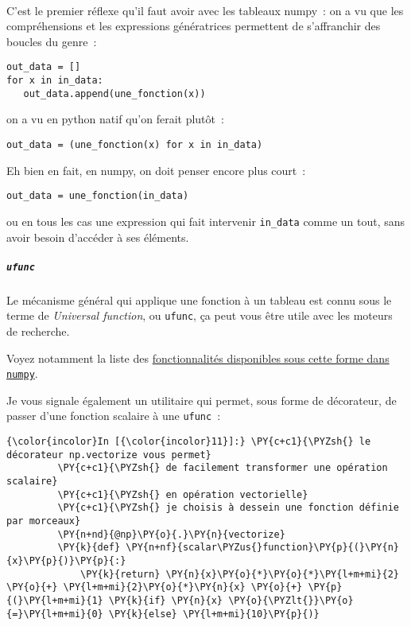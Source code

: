     \begin{center}
    \end{center}
    { \hspace*{\fill} \\}
    
    C'est le premier réflexe qu'il faut avoir avec les tableaux numpy~: on a
vu que les compréhensions et les expressions génératrices permettent de
s'affranchir des boucles du genre~:

\begin{verbatim}
out_data = []
for x in in_data:
   out_data.append(une_fonction(x))
\end{verbatim}

on a vu en python natif qu'on ferait plutôt~:

\begin{verbatim}
out_data = (une_fonction(x) for x in in_data)
\end{verbatim}

Eh bien en fait, en numpy, on doit penser encore plus court~:

\begin{verbatim}
out_data = une_fonction(in_data)
\end{verbatim}

ou en tous les cas une expression qui fait intervenir \texttt{in\_data}
comme un tout, sans avoir besoin d'accéder à ses éléments.

    \hypertarget{ufunc}{%
\subparagraph{\texorpdfstring{\texttt{ufunc}}{ufunc}}\label{ufunc}}

    Le mécanisme général qui applique une fonction à un tableau est connu
sous le terme de \emph{Universal function}, ou \texttt{ufunc}, ça peut
vous être utile avec les moteurs de recherche.

    Voyez notamment la liste des
\href{https://docs.scipy.org/doc/numpy-1.13.0/reference/ufuncs.html}{fonctionnalités
disponibles sous cette forme dans \texttt{numpy}}.

    Je vous signale également un utilitaire qui permet, sous forme de
décorateur, de passer d'une fonction scalaire à une \texttt{ufunc}~:

    \begin{Verbatim}[commandchars=\\\{\}]
{\color{incolor}In [{\color{incolor}11}]:} \PY{c+c1}{\PYZsh{} le décorateur np.vectorize vous permet}
         \PY{c+c1}{\PYZsh{} de facilement transformer une opération scalaire}
         \PY{c+c1}{\PYZsh{} en opération vectorielle}
         \PY{c+c1}{\PYZsh{} je choisis à dessein une fonction définie par morceaux}
         \PY{n+nd}{@np}\PY{o}{.}\PY{n}{vectorize}
         \PY{k}{def} \PY{n+nf}{scalar\PYZus{}function}\PY{p}{(}\PY{n}{x}\PY{p}{)}\PY{p}{:}
             \PY{k}{return} \PY{n}{x}\PY{o}{*}\PY{o}{*}\PY{l+m+mi}{2} \PY{o}{+} \PY{l+m+mi}{2}\PY{o}{*}\PY{n}{x} \PY{o}{+} \PY{p}{(}\PY{l+m+mi}{1} \PY{k}{if} \PY{n}{x} \PY{o}{\PYZlt{}}\PY{o}{=}\PY{l+m+mi}{0} \PY{k}{else} \PY{l+m+mi}{10}\PY{p}{)}
\end{Verbatim}



